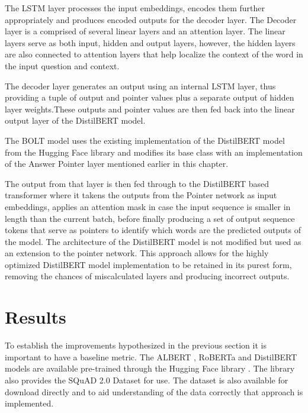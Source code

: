 \documentclass[a4paper,12pt]{report}
\begin{document}
                The LSTM layer processes the input embeddings, encodes them further appropriately and produces encoded outputs for the decoder layer. The Decoder layer is a comprised of several linear layers and an attention layer. The linear layers serve as both input, hidden and output layers, however, the hidden layers are also connected to attention layers that help localize the context of the word in the input question and context.

                The decoder layer generates an output using an internal LSTM layer, thus providing a tuple of output and pointer values plus a separate output of hidden layer weights.These outputs and pointer values are then fed back into the linear output layer of the DistilBERT model.

                The BOLT model uses the existing implementation of the DistilBERT model from the Hugging Face library \citep{hfTransformers} and modifies its base class with an implementation of the Answer Pointer layer mentioned earlier in this chapter.

                The output from that layer is then fed through to the DistilBERT based transformer where it takens the outputs from the Pointer network as input embeddings, applies an attention mask in case the input sequence is smaller in length than the current batch, before finally producing a set of output sequence tokens that serve as pointers to identify which words are the predicted outputs of the model. The architecture of the DistilBERT model is not modified but used as an extension to the pointer network.
                This approach allows for the highly optimized DistilBERT model implementation to be retained in its purest form, removing the chances of miscalculated layers and producing incorrect outputs.

    \chapter{Results}\label{c5}

        To establish the improvements hypothesized in the previous section it is important to have a baseline metric. The ALBERT \citep{albert}, RoBERTa \citep{roberta} and DistilBERT \citep{distil} models are available pre-trained through the Hugging Face library \citep{hfTransformers}. The library also provides the SQuAD 2.0 Dataset \citep{dataset} for use. The dataset is also available for download directly and to aid understanding of the data correctly that approach is implemented.
\end{document}
